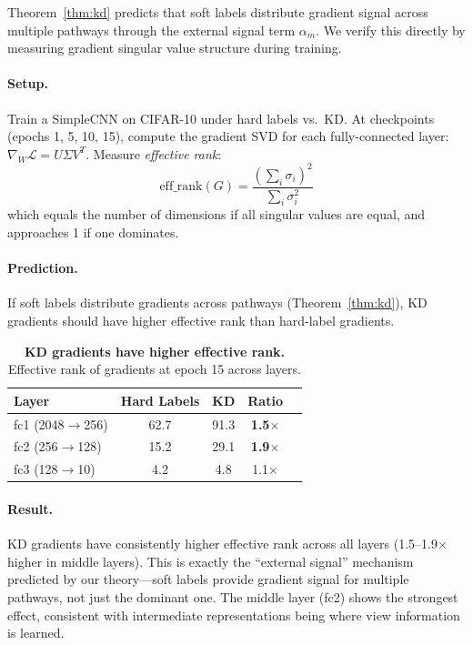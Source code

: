 \documentclass{article}
\newcommand{\cL}{\mathcal{L}}
\begin{document}
Theorem~\ref{thm:kd} predicts that soft labels distribute gradient signal across multiple pathways through the external signal term $\alpha_m$. We verify this directly by measuring gradient singular value structure during training.

\paragraph{Setup.} Train a SimpleCNN on CIFAR-10 under hard labels vs.\ KD. At checkpoints (epochs 1, 5, 10, 15), compute the gradient SVD for each fully-connected layer: $\nabla_W \cL = U \Sigma V^T$. Measure \emph{effective rank}:
\begin{equation}
    \text{eff\_rank}(G) = \frac{\left(\sum_i \sigma_i\right)^2}{\sum_i \sigma_i^2}
\end{equation}
which equals the number of dimensions if all singular values are equal, and approaches 1 if one dominates.

\paragraph{Prediction.} If soft labels distribute gradients across pathways (Theorem~\ref{thm:kd}), KD gradients should have higher effective rank than hard-label gradients.

\begin{table}[h]
\centering
\caption{\textbf{KD gradients have higher effective rank.} Effective rank of gradients at epoch 15 across layers.}
\label{tab:gradient_svd}
\begin{tabular}{@{}lcccc@{}}
\toprule
Layer & Hard Labels & KD & Ratio \\
\midrule
fc1 (2048$\to$256) & 62.7 & 91.3 & \textbf{1.5$\times$} \\
fc2 (256$\to$128) & 15.2 & 29.1 & \textbf{1.9$\times$} \\
fc3 (128$\to$10) & 4.2 & 4.8 & 1.1$\times$ \\
\bottomrule
\end{tabular}
\end{table}

\paragraph{Result.} KD gradients have consistently higher effective rank across all layers (1.5--1.9$\times$ higher in middle layers). This is exactly the ``external signal'' mechanism predicted by our theory---soft labels provide gradient signal for multiple pathways, not just the dominant one. The middle layer (fc2) shows the strongest effect, consistent with intermediate representations being where view information is learned.
\end{document}
